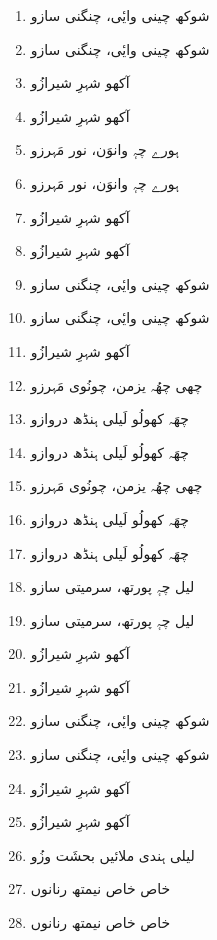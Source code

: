 \documentclass[12pt]{article}
\newcommand{\bigarabic}[1]{\fontsize{16pt}{18pt}\selectfont \textarabic{#1}}
\begin{document}
\begin{multicols}{2}
\columnbreak

\begin{RTL}
\begin{enumerate}[leftmargin=*, label=\arabic*., font=\fontsize{16pt}{18pt}\selectfont]
  \item \bigarabic{شوکھ چینی وایٔی، چنگنی سازو}
  \item \bigarabic{شوکھ چینی وایٔی، چنگنی سازو}
  \item \bigarabic{آکھو شہرِ شیرازُو}
  \item \bigarabic{آکھو شہرِ شیرازُو}
  \item \bigarabic{ہورے چہٕ وانوَن، نور مَہرزو}
  \item \bigarabic{ہورے چہٕ وانوَن، نور مَہرزو}
  \item \bigarabic{آکھو شہرِ شیرازُو}
  \item \bigarabic{آکھو شہرِ شیرازُو}
  \item \bigarabic{شوکھ چینی وایٔی، چنگنی سازو}
  \item \bigarabic{شوکھ چینی وایٔی، چنگنی سازو}
  \item \bigarabic{آکھو شہرِ شیرازُو}
  \item \bigarabic{چھی چھُہ یزمن، چونُوی مَہرزو}
  \item \bigarabic{چھَہ کھولُو لَیلی ہنڈھ دروازو}
  \item \bigarabic{چھَہ کھولُو لَیلی ہنڈھ دروازو}
  \item \bigarabic{چھی چھُہ یزمن، چونُوی مَہرزو}
  \item \bigarabic{چھَہ کھولُو لَیلی ہنڈھ دروازو}
  \item \bigarabic{چھَہ کھولُو لَیلی ہنڈھ دروازو}
  \item \bigarabic{لیل چہٕ پورتھ، سرمیتی سازو}
  \item \bigarabic{لیل چہٕ پورتھ، سرمیتی سازو}
  \item \bigarabic{آکھو شہرِ شیرازُو}
  \item \bigarabic{آکھو شہرِ شیرازُو}
  \item \bigarabic{شوکھ چینی وایٔی، چنگنی سازو}
  \item \bigarabic{شوکھ چینی وایٔی، چنگنی سازو}
  \item \bigarabic{آکھو شہرِ شیرازُو}
  \item \bigarabic{آکھو شہرِ شیرازُو}
  \item \bigarabic{لیلی ہندی ملائیں بحشَت وزُو}
  \item \bigarabic{خاص خاص نیمتھ رنانوں}
  \item \bigarabic{خاص خاص نیمتھ رنانوں}

\end{enumerate}
\end{RTL}
\end{multicols}
\end{document}
